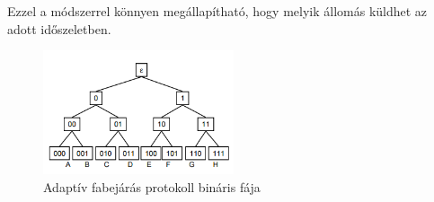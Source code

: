\documentclass[margin=0px]{article}
\begin{document}
\begin{description}
\begin{description}
\begin{itemize}
\begin{itemize}
									Ezzel a módszerrel könnyen megállapítható, hogy melyik állomás küldhet az adott időszeletben.
									\begin{figure}[H]
										\centering
										\includegraphics[width=0.5\textwidth]{img/adaptivfa.png}
										\caption{Adaptív fabejárás protokoll bináris fája}	
									\end{figure}
								\end{itemize}							
						\end{itemize}
				\end{description}
		\end{description}
\end{document}

